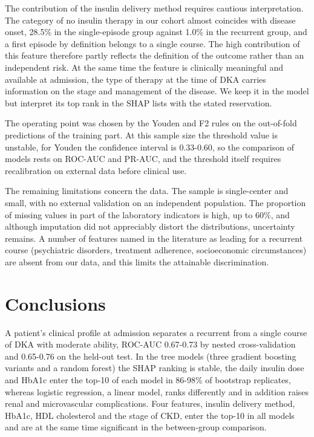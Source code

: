 \documentclass[pdflatex,sn-basic,Numbered]{sn-jnl}
\begin{document}
The contribution of the insulin delivery method requires cautious interpretation. The category of no insulin therapy in our cohort almost coincides with disease onset, 28.5\% in the single-episode group against 1.0\% in the recurrent group, and a first episode by definition belongs to a single course. The high contribution of this feature therefore partly reflects the definition of the outcome rather than an independent risk. At the same time the feature is clinically meaningful and available at admission, the type of therapy at the time of DKA carries information on the stage and management of the disease. We keep it in the model but interpret its top rank in the SHAP lists with the stated reservation.

The operating point was chosen by the Youden and F2 rules on the out-of-fold predictions of the training part. At this sample size the threshold value is unstable, for Youden the confidence interval is 0.33-0.60, so the comparison of models rests on ROC-AUC and PR-AUC, and the threshold itself requires recalibration on external data before clinical use.

The remaining limitations concern the data. The sample is single-center and small, with no external validation on an independent population. The proportion of missing values in part of the laboratory indicators is high, up to 60\%, and although imputation did not appreciably distort the distributions, uncertainty remains. A number of features named in the literature as leading for a recurrent course (psychiatric disorders, treatment adherence, socioeconomic circumstances) are absent from our data, and this limits the attainable discrimination.

\section{Conclusions}\label{sec6}

A patient's clinical profile at admission separates a recurrent from a single course of DKA with moderate ability, ROC-AUC 0.67-0.73 by nested cross-validation and 0.65-0.76 on the held-out test. In the tree models (three gradient boosting variants and a random forest) the SHAP ranking is stable, the daily insulin dose and HbA1c enter the top-10 of each model in 86-98\% of bootstrap replicates, whereas logistic regression, a linear model, ranks differently and in addition raises renal and microvascular complications. Four features, insulin delivery method, HbA1c, HDL cholesterol and the stage of CKD, enter the top-10 in all models and are at the same time significant in the between-group comparison.
\end{document}
